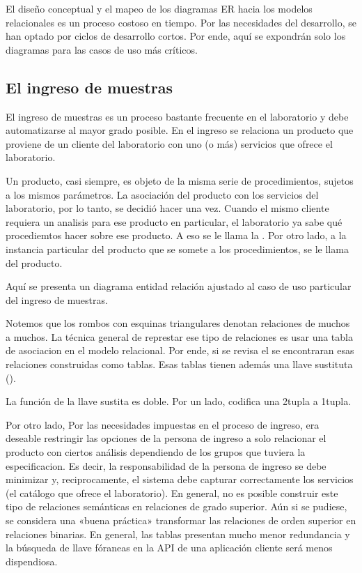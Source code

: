 \documentclass[letterpaper,10pt,spanish]{sphinxmanual}
\begin{document}
El diseño conceptual y el mapeo de los diagramas ER hacia los modelos
relacionales es un proceso costoso en tiempo. Por las necesidades del
desarrollo, se han optado por ciclos de desarrollo cortos. Por ende,
aquí se expondrán solo los diagramas para las casos de uso más críticos.


\subsection{El ingreso de muestras}
\label{\detokenize{requerimientos/SDD:el-ingreso-de-muestras}}
El ingreso de muestras es un proceso bastante frecuente en el laboratorio y
debe automatizarse al mayor grado posible. En el ingreso se relaciona un
producto que proviene de un cliente del laboratorio con uno (o más) servicios
que ofrece el laboratorio.

Un producto, casi siempre,  es objeto de la misma serie de procedimientos,
sujetos a los mismos parámetros. La asociación del producto con los servicios
del laboratorio, por lo tanto,  se decidió hacer una vez. Cuando el mismo
cliente requiera un analisis para ese producto en particular, el laboratorio
ya sabe qué procediemtos hacer sobre ese producto. A eso se le llama la
. Por otro lado, a la instancia particular
del producto que se somete a los procedimientos, se le llama  del producto.

Aquí se presenta un diagrama entidad relación ajustado al caso de uso particular
del ingreso de muestras.


Notemos que los rombos con esquinas triangulares denotan relaciones de
muchos a muchos.  La técnica general de represtar ese tipo de
relaciones es usar una tabla de asociacion en el modelo
relacional. Por ende, si se revisa el  se encontraran esas
relaciones construidas como tablas. Esas tablas tienen además una
llave sustituta ().

La función de la llave sustita es doble. Por un lado, codifica una
2\sphinxhyphen{}tupla a 1\sphinxhyphen{}tupla.

Por otro lado, Por las necesidades impuestas en el proceso de ingreso,
era deseable restringir las opciones de la persona de ingreso a solo
relacionar el producto con ciertos análisis dependiendo de los grupos
que tuviera la especificacion. Es decir, la responsabilidad de la
persona de ingreso se debe minimizar y, reciprocamente, el sistema
debe capturar correctamente los servicios (el catálogo que ofrece el
laboratorio). En general, no es posible construir este tipo de
relaciones semánticas en relaciones de grado superior. Aún si se
pudiese, se considera una «buena práctica» transformar las relaciones
de orden superior en relaciones binarias. En general, las tablas presentan
mucho menor redundancia  y la búsqueda de llave fóraneas en la API
de una aplicación cliente será menos dispendiosa.
\end{document}

